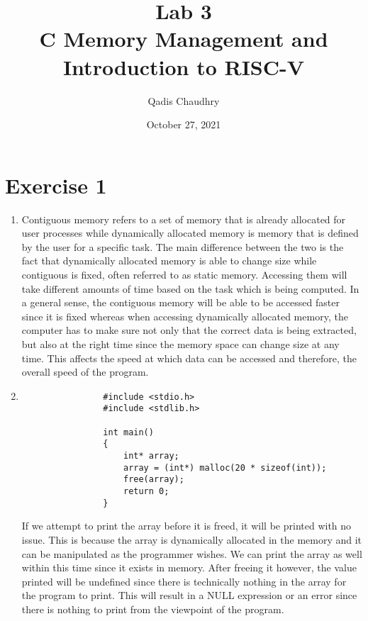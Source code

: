 \documentclass[12pt]{article}
\title{Lab 3 \\ C Memory Management and Introduction to RISC-V}
\author{Qadis Chaudhry}
\date{October 27, 2021}
\begin{document}
\maketitle
    \section*{Exercise 1}
    \begin{enumerate}
        \item
            Contiguous memory refers to a set of memory that is already allocated for user processes while dynamically allocated memory is memory that is defined by the user for a specific task. The main difference between the two is the fact that dynamically allocated memory is able to change size while contiguous is fixed, often referred to as static memory. Accessing them will take different amounts of time based on the task which is being computed. In a general sense, the contiguous memory will be able to be accessed faster since it is fixed whereas when accessing dynamically allocated memory, the computer has to make sure not only that the correct data is being extracted, but also at the right time since the memory space can change size at any time. This affects the speed at which data can be accessed and therefore, the overall speed of the program.
        \item
            \begin{verbatim}
                #include <stdio.h>
                #include <stdlib.h>

                int main()
                {
                    int* array;
                    array = (int*) malloc(20 * sizeof(int));
                    free(array);
                    return 0;
                }
            \end{verbatim}
           If we attempt to print the array before it is freed, it will be printed with no issue. This is because the array is dynamically allocated in the memory and it can be manipulated as the programmer wishes. We can print the array as well within this time since it exists in memory. After freeing it however, the value printed will be undefined since there is technically nothing in the array for the program to print. This will result in a NULL expression or an error since there is nothing to print from the viewpoint of the program.
    \end{enumerate}
\end{document}

